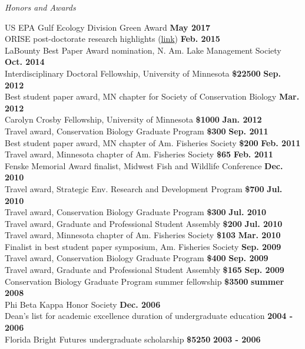 \documentclass[letterpaper,12pt]{article}
\newcommand{\sectitle}[1]{\vspace{\baselineskip} \centerline{\large{\textit{#1}}}}
\begin{document}
\sectitle{Honors and Awards}

US EPA Gulf Ecology Division Green Award \hfill {\bf May 2017} \\
ORISE post-doctorate research highlights (\href{http://orise.orau.gov/science-education/research-experiences/postdoc/15-marcus-beck.aspx}{link}) \hfill {\bf Feb. 2015} \\
LaBounty Best Paper Award nomination, N. Am. Lake Management Society \hfill {\bf Oct. 2014} \\
Interdisciplinary Doctoral Fellowship, University of Minnesota {\bf \$22500} \hfill {\bf Sep. 2012} \\
Best student paper award, MN chapter for Society of Conservation Biology \hfill {\bf Mar. 2012} \\
Carolyn Crosby Fellowship, University of Minnesota {\bf \$1000} \hfill {\bf Jan. 2012} \\
Travel award, Conservation Biology Graduate Program {\bf \$300} \hfill {\bf Sep. 2011} \\
Best student paper award, MN chapter of Am. Fisheries Society {\bf \$200} \hfill {\bf Feb. 2011} \\
Travel award, Minnesota chapter of Am. Fisheries Society {\bf \$65} \hfill {\bf Feb. 2011} \\
Fenske Memorial Award finalist, Midwest Fish and Wildlife Conference \hfill {\bf Dec. 2010} \\
Travel award, Strategic Env. Research and Development Program {\bf \$700} \hfill {\bf Jul. 2010} \\
Travel award, Conservation Biology Graduate Program {\bf \$300} \hfill {\bf Jul. 2010} \\
Travel award, Graduate and Professional Student Assembly {\bf \$200} \hfill {\bf Jul. 2010} \\
Travel award, Minnesota chapter of Am. Fisheries Society {\bf \$103} \hfill {\bf Mar. 2010} \\
Finalist in best student paper symposium, Am. Fisheries Society \hfill {\bf Sep. 2009} \\
Travel award, Conservation Biology Graduate Program {\bf \$400} \hfill {\bf Sep. 2009} \\
Travel award, Graduate and Professional Student Assembly {\bf \$165} \hfill {\bf Sep. 2009} \\
Conservation Biology Graduate Program summer fellowship {\bf \$3500} \hfill {\bf summer 2008} \\
Phi Beta Kappa Honor Society \hfill {\bf Dec. 2006} \\
Dean's list for academic excellence duration of undergraduate education \hfill {\bf 2004 - 2006} \\
Florida Bright Futures undergraduate scholarship {\bf \$5250} \hfill {\bf 2003 - 2006} 
\end{document}
